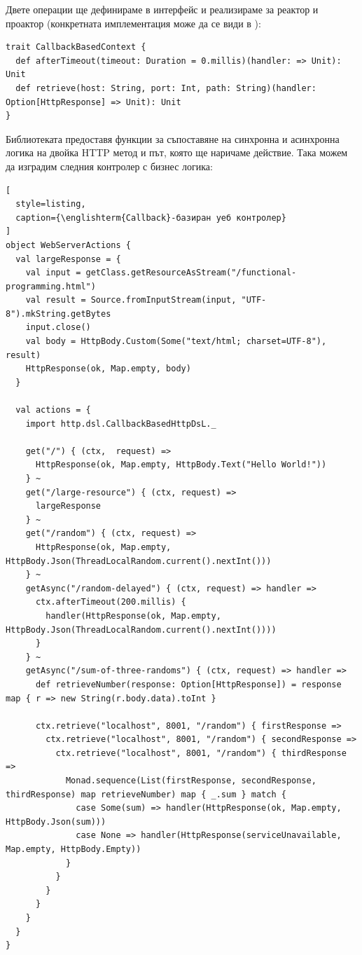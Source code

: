 Двете операции ще дефинираме в интерфейс  и реализираме за реактор и проактор (конкретната имплементация може да се види в ):

\begin{lstlisting}
trait CallbackBasedContext {
  def afterTimeout(timeout: Duration = 0.millis)(handler: => Unit): Unit
  def retrieve(host: String, port: Int, path: String)(handler: Option[HttpResponse] => Unit): Unit
}
\end{lstlisting}

Библиотеката предоставя функции за съпоставяне на синхронна и асинхронна логика на двойка HTTP метод и път, която ще наричаме действие. Така можем да изградим следния контролер с бизнес логика:

\begin{lstlisting}[
  style=listing,
  caption={\englishterm{Callback}-базиран уеб контролер}
]
object WebServerActions {
  val largeResponse = {
    val input = getClass.getResourceAsStream("/functional-programming.html")
    val result = Source.fromInputStream(input, "UTF-8").mkString.getBytes
    input.close()
    val body = HttpBody.Custom(Some("text/html; charset=UTF-8"), result)
    HttpResponse(ok, Map.empty, body)
  }
  
  val actions = {
    import http.dsl.CallbackBasedHttpDsL._
    
    get("/") { (ctx,  request) =>
      HttpResponse(ok, Map.empty, HttpBody.Text("Hello World!"))
    } ~
    get("/large-resource") { (ctx, request) =>
      largeResponse
    } ~
    get("/random") { (ctx, request) =>
      HttpResponse(ok, Map.empty, HttpBody.Json(ThreadLocalRandom.current().nextInt()))
    } ~
    getAsync("/random-delayed") { (ctx, request) => handler =>
      ctx.afterTimeout(200.millis) {
        handler(HttpResponse(ok, Map.empty, HttpBody.Json(ThreadLocalRandom.current().nextInt())))
      }
    } ~
    getAsync("/sum-of-three-randoms") { (ctx, request) => handler =>
      def retrieveNumber(response: Option[HttpResponse]) = response map { r => new String(r.body.data).toInt }
      
      ctx.retrieve("localhost", 8001, "/random") { firstResponse =>
        ctx.retrieve("localhost", 8001, "/random") { secondResponse =>
          ctx.retrieve("localhost", 8001, "/random") { thirdResponse =>
            Monad.sequence(List(firstResponse, secondResponse, thirdResponse) map retrieveNumber) map { _.sum } match {
              case Some(sum) => handler(HttpResponse(ok, Map.empty, HttpBody.Json(sum)))
              case None => handler(HttpResponse(serviceUnavailable, Map.empty, HttpBody.Empty))
            }
          }
        }
      }
    }
  }
}
\end{lstlisting}

